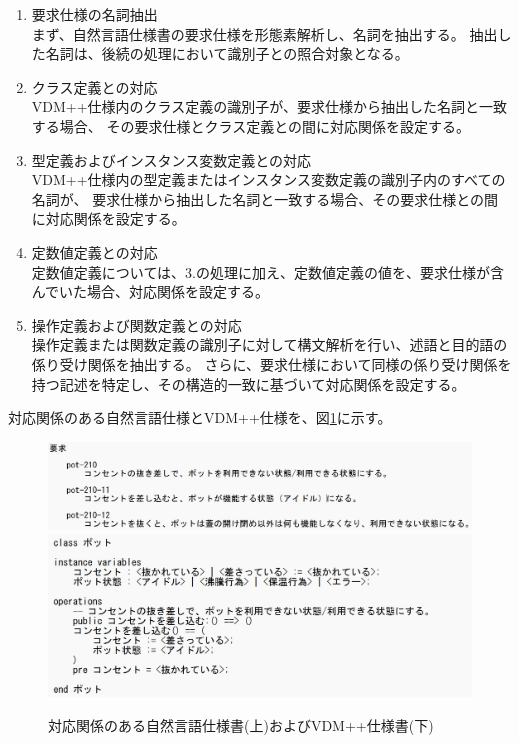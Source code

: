 \documentclass[a4j,twocolumn,10pt]{jceee-kyushu-euc}
\begin{document}
\begin{enumerate}
      \setlength{\itemsep}{-2pt}
      \item 要求仕様の名詞抽出\\
            まず、自然言語仕様書の要求仕様を形態素解析し、名詞を抽出する。
            抽出した名詞は、後続の処理において識別子との照合対象となる。
      \item クラス定義との対応\\
            VDM++仕様内のクラス定義の識別子が、要求仕様から抽出した名詞と一致する場合、
            その要求仕様とクラス定義との間に対応関係を設定する。
      \item 型定義およびインスタンス変数定義との対応\\
            VDM++仕様内の型定義またはインスタンス変数定義の識別子内のすべての名詞が、
            要求仕様から抽出した名詞と一致する場合、その要求仕様との間に対応関係を設定する。
      \item 定数値定義との対応\\
            定数値定義については、3.の処理に加え、定数値定義の値を、要求仕様が含んでいた場合、対応関係を設定する。
      \item 操作定義および関数定義との対応\\
            操作定義または関数定義の識別子に対して構文解析を行い、述語と目的語の係り受け関係を抽出する。
            さらに、要求仕様において同様の係り受け関係を持つ記述を特定し、その構造的一致に基づいて対応関係を設定する。
\end{enumerate}

対応関係のある自然言語仕様とVDM++仕様を、図\ref{fig:sample_text}に示す。

\begin{figure}[tp]
      \centering
      \includegraphics[width=\columnwidth]{../image/jceee/sample_text2.png}
      \includegraphics[width=\columnwidth]{../image/jceee/vdm_example.png}
      \caption{対応関係のある自然言語仕様書(上)およびVDM++仕様書(下)}
      \label{fig:sample_text}
\end{figure}
\end{document}
